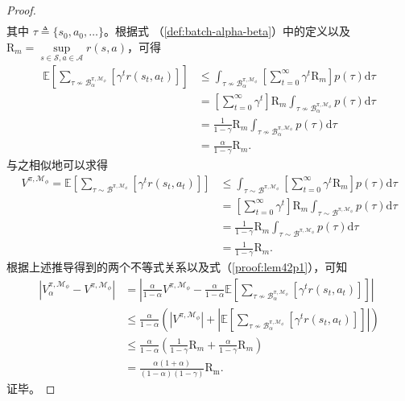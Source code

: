 \begin{proof}
\begin{equation}
\begin{aligned}
\end{aligned}
\end{equation}
其中 $\tau\triangleq\{s_0,a_0,\ldots\}$。根据式 （\ref{def:batch-alpha-beta}）中的定义以及  $\mathrm{R}_{m}=\underset{s\in\mathcal{S},a\in\mathcal{A}}{\sup}r(s,a)$，可得
\begin{equation}
\begin{aligned}
\mathbb{E}\left[{\sum}_{\tau \not\sim\mathcal{B}_\alpha^{\pi,\mathcal{M}_\phi}}\left[\gamma^t r(s_t,a_t)\right]\right] &\leq\int_{\tau\not\sim{\mathcal{B}_\alpha^{\pi,\mathcal{M}_\phi}}}\left[\sum_{t=0}^\infty\gamma^t \mathrm{R}_m\right]p(\tau)\mathrm{d}\tau\\
&=\left[\sum_{t=0}^\infty\gamma^t\right]\mathrm{R}_m\int_{\tau\not\sim{\mathcal{B}_\alpha^{\pi,\mathcal{M}_\phi}}}p(\tau)\mathrm{d}\tau\\
&= \frac{1}{1-\gamma}\mathrm{R}_m \int_{\tau\not\sim{\mathcal{B}_\alpha^{\pi,\mathcal{M}_\phi}}}p(\tau)\mathrm{d}\tau\\
&=\frac{\alpha}{1-\gamma}\mathrm{R}_m.
\end{aligned}
\end{equation}
与之相似地可以求得
\begin{equation}
\begin{aligned}
V^{\pi,\mathcal{M}_\phi} = \mathbb{E}\left[{\sum}_{\tau \sim\mathcal{B}^{\pi,\mathcal{M}_\phi}}\left[\gamma^t r(s_t,a_t)\right]\right] &\leq\int_{\tau \sim\mathcal{B}^{\pi,\mathcal{M}_\phi}}\left[\sum_{t=0}^\infty\gamma^t \mathrm{R}_m\right]p(\tau)\mathrm{d}\tau\\
&=\left[\sum_{t=0}^\infty\gamma^t\right]\mathrm{R}_m\int_{\tau \sim\mathcal{B}^{\pi,\mathcal{M}_\phi}}p(\tau)\mathrm{d}\tau\\
&= \frac{1}{1-\gamma}\mathrm{R}_m \int_{\tau \sim\mathcal{B}^{\pi,\mathcal{M}_\phi}}p(\tau)\mathrm{d}\tau\\
&=\frac{1}{1-\gamma}\mathrm{R}_m.
\end{aligned}
\end{equation}
根据上述推导得到的两个不等式关系以及式（\ref{proof:lem42p1}），可知
\begin{equation}
\begin{aligned}
|{V}_\alpha^{\pi, \mathcal{M}_{\phi}} - {V}^{\pi,\mathcal{M}_{\phi}}| &=  \left|\frac{\alpha}{1-\alpha}V^{\pi,\mathcal{M}_\phi}-\frac{\alpha}{1-\alpha}\mathbb{E}\left[{\sum}_{\tau \not\sim\mathcal{B}_\alpha^{\pi,\mathcal{M}_\phi}}\left[\gamma^t r(s_t,a_t)\right]\right]\right| \\
&\leq\frac{\alpha}{1-\alpha}\left(\left|V^{\pi,\mathcal{M}_\phi}\right|+\left|\mathbb{E}\left[{\sum}_{\tau \not\sim\mathcal{B}_\alpha^{\pi,\mathcal{M}_\phi}}\left[\gamma^t r(s_t,a_t)\right]\right]\right|\right)\\
&\leq \frac{\alpha}{1-\alpha}\left(\frac{1}{1-\gamma}\mathrm{R}_m+\frac{\alpha}{1-\gamma}\mathrm{R}_m\right) \\
&=\frac{\alpha(1+\alpha)}{(1-\alpha)(1-\gamma)}\mathrm{R_{m}}. \label{eq:lem42}
\end{aligned}
\end{equation}
证毕。
\end{proof}

